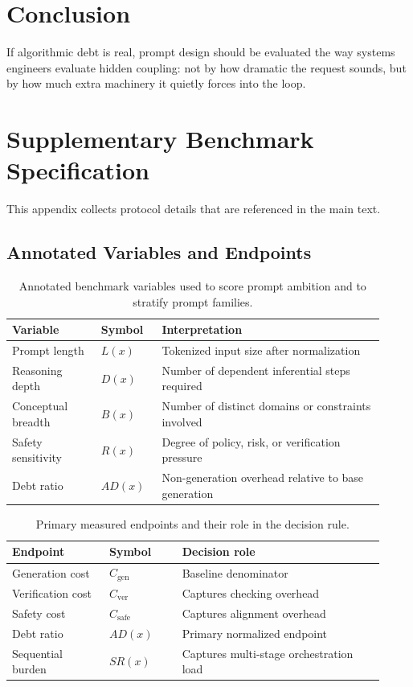 \documentclass{svjour3}
\begin{document}
\section{Conclusion}
If algorithmic debt is real, prompt design should be evaluated the way systems engineers evaluate hidden coupling: not by how dramatic the request sounds, but by how much extra machinery it quietly forces into the loop.

\appendix
\section{Supplementary Benchmark Specification}
This appendix collects protocol details that are referenced in the main text.

\subsection{Annotated Variables and Endpoints}
\begin{table}[t]
\centering
\small
\caption{Annotated benchmark variables used to score prompt ambition and to stratify prompt families.}
\label{tab:bench-variables}
\small
\begin{tabular}{@{}p{0.22\linewidth}p{0.15\linewidth}p{0.55\linewidth}@{}}
\toprule
Variable & Symbol & Interpretation \\
\midrule
Prompt length & $L(x)$ & Tokenized input size after normalization \\
Reasoning depth & $D(x)$ & Number of dependent inferential steps required \\
Conceptual breadth & $B(x)$ & Number of distinct domains or constraints involved \\
Safety sensitivity & $R(x)$ & Degree of policy, risk, or verification pressure \\
Debt ratio & $AD(x)$ & Non-generation overhead relative to base generation \\
\bottomrule
\end{tabular}
\end{table}

\begin{table}[t]
\centering
\small
\caption{Primary measured endpoints and their role in the decision rule.}
\label{tab:bench-endpoints}
\small
\begin{tabular}{@{}p{0.24\linewidth}p{0.18\linewidth}p{0.50\linewidth}@{}}
\toprule
Endpoint & Symbol & Decision role \\
\midrule
Generation cost & $C_{\text{gen}}$ & Baseline denominator \\
Verification cost & $C_{\text{ver}}$ & Captures checking overhead \\
Safety cost & $C_{\text{safe}}$ & Captures alignment overhead \\
Debt ratio & $AD(x)$ & Primary normalized endpoint \\
Sequential burden & $SR(x)$ & Captures multi-stage orchestration load \\
\bottomrule
\end{tabular}
\end{table}
\end{document}
